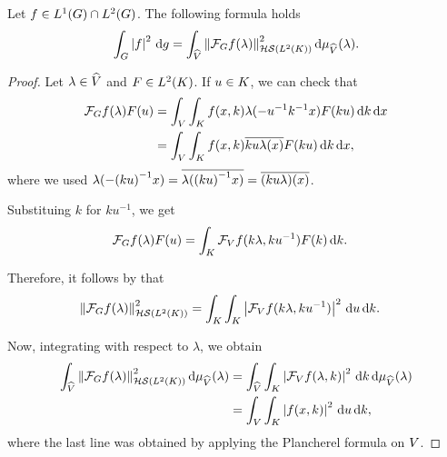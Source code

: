 \begin{proposition}
\label{proposition:Plancherel_formula}
    Let $f \in \Lebesgue{1}{\Group} \cap \Lebesgue{2}{\Group}$.
    The following formula holds
    \begin{align}
        \int_G \abs{f}^2 \dd g = \int_\dualGroup{\VectorSpace} \norm[\HilbertSchmidt{\Lebesgue{2}{\CompactGroup}}]{\Fourier{f}(\lambda)}^2 \dd \Plancherel{\VectorSpace}(\lambda).
        \label{proposition:Plancherel_formula:formula}
    \end{align}
\end{proposition}
\begin{proof}
    Let $\lambda \in \dualGroup{\VectorSpace}$ and $F \in \Lebesgue{2}{\CompactGroup}$.
    If $u \in \CompactGroup$, we can check that
    \begin{align*}
        \Fourier{f}(\lambda) F(u)
        &= \int_\VectorSpace \int_\CompactGroup f(x, k) \lambda(-u^{-1} k^{-1} x) F(k u) \dd k \dd x\\
        &= \int_\VectorSpace \int_\CompactGroup f(x, k) \conj{k u \lambda(x)} F(k u) \dd k \dd x,
    \end{align*}
    where we used $\lambda(-{(k u)}^{-1} x) = \conj{\lambda({(k u)}^{-1} x)} = \conj{(k u \lambda)(x)}$.

    Substituing $k$ for $k u^{-1}$, we get
    \begin{align*}
        \Fourier{f}(\lambda) F(u)
        &= \int_\CompactGroup \Fourier[\VectorSpace]{f}(k \lambda, k u^{-1}) F(k) \dd k.
    \end{align*}

    Therefore, it follows by \cite[Theorem VI.23]{Reed72} that
    \begin{align*}
        \norm[\HilbertSchmidt{\Lebesgue{2}{\CompactGroup}}]{\Fourier{f}(\lambda)}^2
        &= \int_\CompactGroup \int_\CompactGroup \abs{\Fourier[\VectorSpace]{f}(k \lambda, k u^{-1})}^2 \dd u \dd k.
    \end{align*}

    Now, integrating with respect to $\lambda$, we obtain
    \begin{align*}
        \int_\dualGroup{\VectorSpace} \norm[\HilbertSchmidt{\Lebesgue{2}{\CompactGroup}}]{\Fourier{f}(\lambda)}^2 \dd \Plancherel{\VectorSpace}(\lambda)
        &= \int_\dualGroup{\VectorSpace} \int_\CompactGroup \abs{\Fourier[\VectorSpace]{f}(\lambda, k)}^2 \dd k \dd \Plancherel{\VectorSpace}(\lambda)\\
        &= \int_\VectorSpace \int_\CompactGroup \abs{f(x, k)}^2 \dd u \dd k,
    \end{align*}
    where the last line was obtained by applying the Plancherel formula on $\VectorSpace$.
\end{proof}

